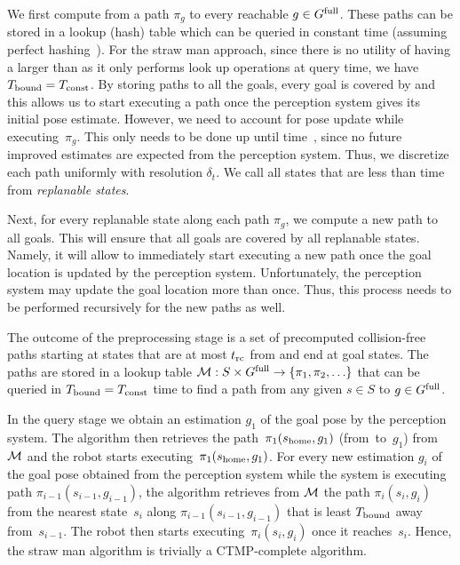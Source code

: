 \documentclass[a4paper]{report}
\begin{document}
We first compute from \Shome a path $\pi_g$ to every reachable $g \in G^{\textrm{full}}$. 
These paths can be stored in a lookup (hash) table which can be queried in constant time \Tconst (assuming perfect hashing~\cite{czech1997perfect}).
For the straw man approach, since there is no utility of having a \Tbound larger than \Tconst as it only performs look up operations at query time, we have $T_{\textrm{bound}} = T_{\textrm{const}}$.
By storing paths to all the goals, every goal is covered by \Shome and this allows us to start executing a path once the perception system gives its initial pose estimate.
However, we need to account for pose update while executing~$\pi_g$. 
%
This only needs to be done up until time~\Trc, since no future improved estimates are expected from the perception system.
Thus, we discretize each path uniformly with resolution $\delta_t$.
%
We call all states that are less than \Trc time from \Shome \emph{replanable states}.


Next, for every replanable state along each path $\pi_g$, we compute a new path to all goals. 
%
This will ensure that all goals are covered by all replanable states. Namely, it will allow to immediately start executing a new path once the goal location is updated by the perception system.
%
Unfortunately, the perception system may update the goal location more than once. Thus, this process needs to be performed recursively for the new paths as well.


The outcome of the preprocessing stage is a set of precomputed collision-free paths starting at states that are at most $t_{\textrm{rc}}$ from \Shome and end at goal states.
The paths are stored in a lookup table $\mathcal{M}: S \times G^{\textrm{full}} \rightarrow \{ \pi_1, \pi_2, \ldots \}$ that can be queried in $T_{\textrm{bound}}=T_{\textrm{const}}$ time to find a path from any given $s \in S$ to $g \in G^{\textrm{full}}$.


In the query stage we obtain an estimation $g_1$ of the goal pose by the perception system. 
The algorithm then retrieves the path~$\pi_1(s_{\textrm{home}},g_1)$ (from~\Shome to~$g_1$) from $\mathcal{M}$ and the robot starts executing~$\pi_1(s_{\textrm{home}},g_1)$.
%
For every new estimation $g_i$ of the goal pose obtained from the perception system while the system is executing path $\pi_{i-1}(s_{i-1},g_{i-1})$, the algorithm retrieves from $\mathcal{M}$ the path $\pi_i(s_i,g_i)$ from the nearest state~$s_i$ along $\pi_{i-1}(s_{i-1},g_{i-1})$ that is least $T_{\textrm{bound}}$ away from~$s_{i-1}$. The robot then starts executing~$\pi_i(s_i,g_i)$ once it reaches~$s_i$.
Hence, the straw man algorithm is trivially a CTMP-complete algorithm.
\end{document}
